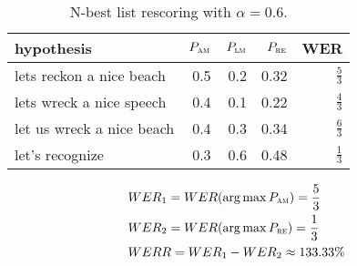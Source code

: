 \begin{table}[h!]
  \caption[N-best list rescoring]{N-best list rescoring with $\alpha=0.6$.}
  \label{table:nbest}
    \centering
    \begin{tabular*}{.6\linewidth}{@{\extracolsep{\fill}}lrrrr}
	    hypothesis & $P_{\textsc{am}}$ & $P_{\textsc{lm}}$ & $P_{\textsc{re}}$ & WER\\
	        \midrule
		lets reckon a nice beach    & 0.5 & 0.2 & 0.32 & $\frac{5}{3}$\\
		lets wreck a nice speech    & 0.4 & 0.1 & 0.22 & $\frac{4}{3}$\\
		let us wreck a nice beach   & 0.4 & 0.3 & 0.34 & $\frac{6}{3}$\\
		let's recognize             & 0.3 & 0.6 & 0.48 & $\frac{1}{3}$\\
    \end{tabular*}
\end{table}

	\begin{align}
		\label{equation:WERR}
		&WER_{1}=WER(\operatorname*{arg\, max}{P_{\textsc{am}}})=\frac{5}{3} \nonumber\\
		&WER_{2}=WER(\operatorname*{arg\, max}{P_{\textsc{re}}})=\frac{1}{3} \nonumber\\
		&WERR =  WER_{1} - WER_{2}\approx133.33\%
	\end{align}

